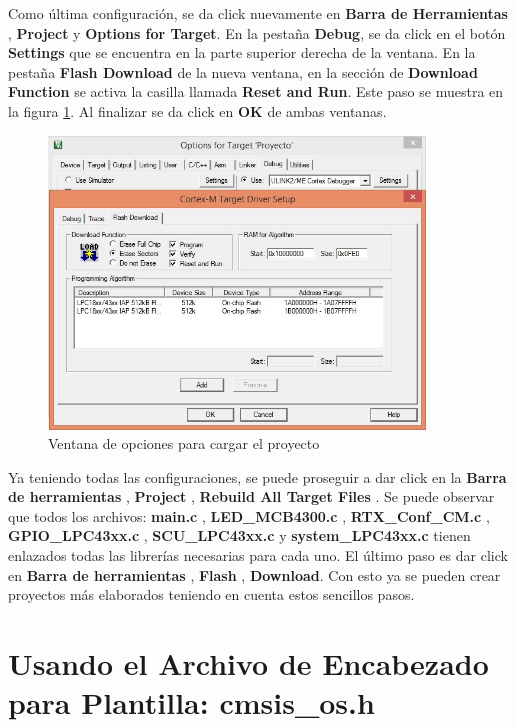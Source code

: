 \documentclass[12pt, twoside]{report}
\begin{document}
Como última configuración, se da click nuevamente en \textbf{Barra de Herramientas} , \textbf{Project} y \textbf{Options for Target}. En la pestaña \textbf{Debug}, se da click en el botón \textbf{Settings} que se encuentra en la parte superior derecha de la ventana. En la pestaña \textbf{Flash Download} de la nueva ventana, en la sección de\textbf{ Download Function} se activa la casilla llamada \textbf{Reset and Run}. Este paso se muestra en la figura \ref{cap1:006}. Al finalizar se da click en \textbf{OK} de ambas ventanas. 

\begin{figure}[H]
	\centering
	\includegraphics[width=100mm]{load}
	\caption{Ventana de opciones para cargar el proyecto }
	\label{cap1:006}
\end{figure}

Ya teniendo todas las configuraciones, se puede proseguir a dar click en la \textbf{Barra de herramientas} , \textbf{Project} , \textbf{ Rebuild All Target Files} . Se puede observar que todos los archivos: \textbf{main.c} , \textbf{LED\_MCB4300.c} , \textbf{RTX\_Conf\_CM.c} , \textbf{GPIO\_LPC43xx.c} , \textbf{SCU\_LPC43xx.c} y \textbf{system\_LPC43xx.c} tienen enlazados todas las librerías necesarias para cada uno. El último paso es dar click en \textbf{Barra de herramientas} , \textbf{Flash} , \textbf{ Download}. Con esto ya se pueden crear proyectos más elaborados teniendo en cuenta estos sencillos pasos. 

\chapter{Usando el Archivo de Encabezado para Plantilla: cmsis\_os.h}
\end{document}
